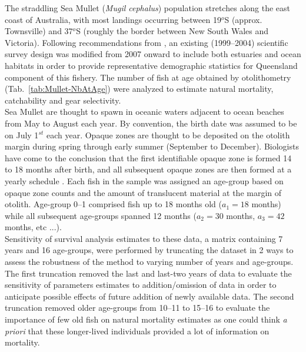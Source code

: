 The straddling Sea Mullet ({\it Mugil cephalus}) population stretches along the east coast of Australia, with most landings occurring between 19$^{o}$S (approx. Townsville) and 37$^{o}$S (roughly the border between New South Wales and Victoria). Following recommendations from \cite{Bell2005r}, an existing (1999--2004) scientific survey design was modified from 2007 onward to include both estuaries and ocean habitats in order to provide representative demographic statistics for Queensland component of this fishery. The number of fish at age obtained by otolithometry (Tab.~\ref{tab:Mullet-NbAtAge}) were analyzed to estimate natural mortality, catchability and gear selectivity. \\

Sea Mullet are thought to spawn in oceanic waters adjacent to ocean beaches from May to August each year. By convention, the birth date was assumed to be on July 1$^{st}$ each year. Opaque zones are thought to be deposited on the otolith margin during spring through early summer (September to December). Biologists have come to the conclusion that the first identifiable opaque zone is formed 14 to 18 months after birth, and all subsequent opaque zones are then formed at a yearly schedule \citep{Smith2003}. Each fish in the sample was assigned an age-group based on opaque zone counts and the amount of translucent material at the margin of otolith. Age-group 0--1 comprised fish up to 18 months old ($a_{1}=18$ months) while all subsequent age-groups spanned 12 months ($a_{2} = 30$ months, $a_{3}= 42$ months, etc ...).\\

Sensitivity of survival analysis estimates to these data, a matrix containing 7 years and 16 age-groups, were performed by truncating the dataset in 2 ways to assess the robustness of the method to varying number of years and age-groups. The first truncation removed the last and last-two years of data to evaluate the sensitivity of parameters estimates to addition/omission of data in order to anticipate possible effects of future addition of newly available data. The second truncation removed older age-groups from 10--11 to 15--16 to evaluate the importance of few old fish on natural mortality estimates as one could think {\it a priori} that these longer-lived individuals provided a lot of information on mortality.\\


